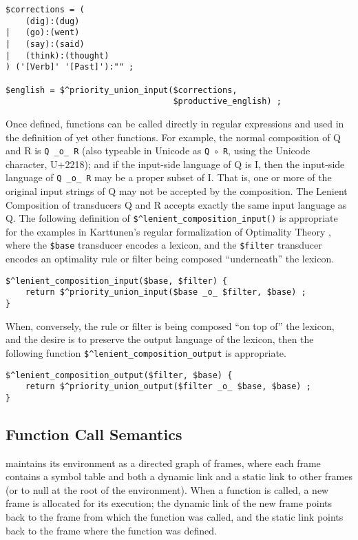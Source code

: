 \begin{Verbatim}
$corrections = (
    (dig):(dug)
|   (go):(went)
|   (say):(said)
|   (think):(thought)
) ('[Verb]' '[Past]'):"" ;

$english = $^priority_union_input($corrections, 
                                  $productive_english) ;
\end{Verbatim}


Once defined, functions can be called directly in regular
expressions and used in the definition of yet other functions.  For
example, the normal composition of Q and R 
is \verb!Q _o_ R! (also typeable in Unicode as \verb!Q!~$\circ$~\verb!R!, using the
Unicode  character, U+2218); and if the input-side language of Q is I, then
the input-side language of \verb!Q _o_ R! may be a proper subset of I.
That is, one or more of the original input strings of Q may not be accepted by the 
composition.  The Lenient Composition of transducers Q and R accepts exactly the 
same input language as Q.  The
following definition of \verb!$^lenient_composition_input()! is
appropriate for the examples in Karttunen's regular formalization of Optimality Theory
\citep{karttunen:1998}, where the \verb!$base!
transducer encodes a lexicon, and the \verb!$filter! transducer
encodes an optimality rule or filter being composed
``underneath''
the lexicon.

\begin{Verbatim}
$^lenient_composition_input($base, $filter) {
    return $^priority_union_input($base _o_ $filter, $base) ;
}
\end{Verbatim}

\noindent
When, conversely, the rule or filter is being
composed ``on top of'' the lexicon, and the desire is to
preserve the output language of the lexicon, then the following
function \verb!$^lenient_composition_output! is appropriate.

\begin{Verbatim}
$^lenient_composition_output($filter, $base) {
    return $^priority_union_output($filter _o_ $base, $base) ;
}
\end{Verbatim}



\subsection{Function Call Semantics}

\Kleene{} maintains its environment as a directed graph of frames,
where each frame
contains a symbol table and both a dynamic link and a static link to other frames (or to null at the root of the environment).  When a function is called, a new
frame is allocated for its execution; the dynamic link of the
new frame points back to the frame
from which the function was called, and the static link points back to the
frame where the function was defined.  

